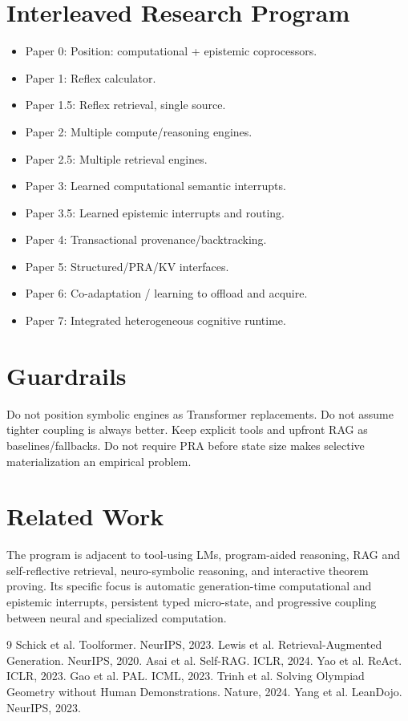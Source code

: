 \documentclass[11pt]{article}
\begin{document}
\section{Interleaved Research Program}
\begin{itemize}
\item Paper 0: Position: computational + epistemic coprocessors.
\item Paper 1: Reflex calculator.
\item Paper 1.5: Reflex retrieval, single source.
\item Paper 2: Multiple compute/reasoning engines.
\item Paper 2.5: Multiple retrieval engines.
\item Paper 3: Learned computational semantic interrupts.
\item Paper 3.5: Learned epistemic interrupts and routing.
\item Paper 4: Transactional provenance/backtracking.
\item Paper 5: Structured/PRA/KV interfaces.
\item Paper 6: Co-adaptation / learning to offload and acquire.
\item Paper 7: Integrated heterogeneous cognitive runtime.
\end{itemize}

\section{Guardrails}
Do not position symbolic engines as Transformer replacements. Do not assume tighter coupling is always better. Keep explicit tools and upfront RAG as baselines/fallbacks. Do not require PRA before state size makes selective materialization an empirical problem.

\section{Related Work}
The program is adjacent to tool-using LMs, program-aided reasoning, RAG and self-reflective retrieval, neuro-symbolic reasoning, and interactive theorem proving. Its specific focus is automatic generation-time computational and epistemic interrupts, persistent typed micro-state, and progressive coupling between neural and specialized computation.


\begin{thebibliography}{9}
 Schick et al. Toolformer. NeurIPS, 2023.
 Lewis et al. Retrieval-Augmented Generation. NeurIPS, 2020.
 Asai et al. Self-RAG. ICLR, 2024.
 Yao et al. ReAct. ICLR, 2023.
 Gao et al. PAL. ICML, 2023.
 Trinh et al. Solving Olympiad Geometry without Human Demonstrations. Nature, 2024.
 Yang et al. LeanDojo. NeurIPS, 2023.
\end{thebibliography}
\end{document}
